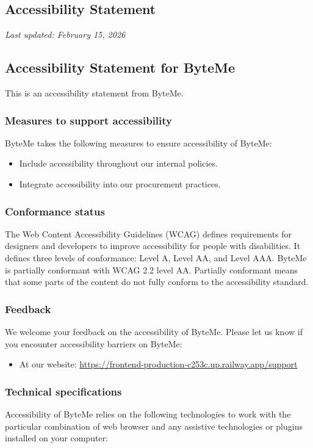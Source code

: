 \documentclass[11pt, a4paper]{report}
\begin{document}
\begin{itemize}
\chapter{Accessibility Statement}
\textit{Last updated: February 15, 2026}
\bigskip

\section*{Accessibility Statement for ByteMe}
This is an accessibility statement from ByteMe.

\subsection*{Measures to support accessibility}
ByteMe takes the following measures to ensure accessibility of ByteMe:

\begin{itemize}
	\item Include accessibility throughout our internal policies.
	\item Integrate accessibility into our procurement practices.
\end{itemize}

\subsection*{Conformance status}
The Web Content Accessibility Guidelines (WCAG) defines requirements for designers and developers to improve accessibility for people with disabilities. It defines three levels of conformance: Level A, Level AA, and Level AAA. ByteMe is partially conformant with WCAG 2.2 level AA. Partially conformant means that some parts of the content do not fully conform to the accessibility standard.

\subsection*{Feedback}
We welcome your feedback on the accessibility of ByteMe. Please let us know if you encounter accessibility barriers on ByteMe:

\begin{itemize}
	\item At our website: \url{https://frontend-production-c253c.up.railway.app/support}
\end{itemize}

\subsection*{Technical specifications}
Accessibility of ByteMe relies on the following technologies to work with the particular combination of web browser and any assistive technologies or plugins installed on your computer:


\end{itemize}
\end{document}
